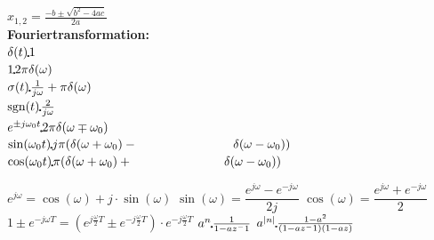 \begin{landscape}
\begin{minipage}{0.2\linewidth}
$x_{1,2}=\frac{-b\pm \sqrt{b^2-4ac}}{2a}$\\

\textbf{Fouriertransformation:}\\

$\delta(t)\FT 1$\\
$1\FT 2\pi \delta(\omega)$\\
$\sigma(t)\FT \frac{1}{j\omega}+\pi\delta(\omega)$\\
$\text{sgn}(t)\FT \frac{2}{j\omega}$\\
$e^{\pm j \omega_0 t} \FT 2\pi \delta(\omega \mp \omega_0)$\\
$\sin(\omega_0t)\FT j\pi(\delta(\omega +\omega_0)-\newline\text{\hspace{2.7cm}}\delta(\omega -\omega_0))$\\
$\cos(\omega_0t)\FT \pi(\delta(\omega +\omega_0)+\newline\text{\hspace{2.6cm}}\delta(\omega -\omega_0))$\\
\end{minipage}

\begin{minipage}{\linewidth}
\vspace*{-1cm}
$e^{j\omega}=\cos(\omega) + j \cdot \sin(\omega)$
\quad
$\sin(\omega)=\dfrac{e^{j\omega} - e^{-j\omega}}{2j}$
\quad
$\cos(\omega)=\dfrac{e^{j\omega} + e^{-j\omega}}{2}$
\quad
$1\pm e^{-j\omega T}= (e^{j\frac{\omega}{2} T}\pm e^{-j\frac{\omega}{2} T})\cdot e^{-j\frac{\omega}{2} T}$
\quad
$a^n \FT \frac{1}{1-az^-1}$
\quad
$a^{|n|} \FT \frac{1-a^2}{(1-az^-1)(1-az)}$
\quad
\vspace*{-2cm}
\end{minipage}


\end{landscape}
